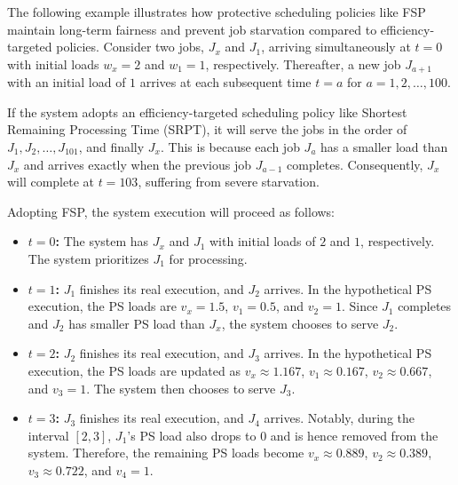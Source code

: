 
The following example illustrates how protective scheduling policies like FSP maintain long-term fairness and prevent job starvation compared to efficiency-targeted policies. Consider two jobs, $J_x$ and $J_1$, arriving simultaneously at $t=0$ with initial loads $w_x=2$ and $w_1=1$, respectively. Thereafter, a new job $J_{a+1}$ with an initial load of $1$ arrives at each subsequent time $t=a$ for $a = 1, 2, \dots, 100$.

If the system adopts an efficiency-targeted scheduling policy like Shortest Remaining Processing Time (SRPT), it will serve the jobs in the order of $J_1, \allowbreak J_2, \allowbreak \dots, \allowbreak J_{101}$, and finally $J_x$. This is because each job $J_a$ has a smaller load than $J_x$ and arrives exactly when the previous job $J_{a-1}$ completes. Consequently, $J_x$ will complete at $t=103$, suffering from severe starvation. 

Adopting FSP, the system execution will proceed as follows:

\begin{itemize}
    \item \textbf{$t=0$:} The system has $J_x$ and $J_1$ with initial loads of $2$ and $1$, respectively. The system prioritizes $J_1$ for processing.
    
    \item \textbf{$t=1$:} $J_1$ finishes its real execution, and $J_2$ arrives. In the hypothetical PS execution, the PS loads are $v_x=1.5$, $v_1=0.5$, and $v_2=1$. Since $J_1$ completes and $J_2$ has smaller PS load than $J_x$, the system chooses to serve $J_2$.
    
    \item \textbf{$t=2$:} $J_2$ finishes its real execution, and $J_3$ arrives. In the hypothetical PS execution, the PS loads are updated as $v_x \approx 1.167$, $v_1 \approx 0.167$, $v_2 \approx 0.667$, and $v_3=1$. The system then chooses to serve $J_3$.
    
    \item \textbf{$t=3$:} $J_3$ finishes its real execution, and $J_4$ arrives. Notably, during the interval $[2, 3]$, $J_1$'s PS load also drops to $0$ and is hence removed from the system. Therefore, the remaining PS loads become $v_x \approx 0.889$, $v_2 \approx 0.389$, $v_3 \approx 0.722$, and $v_4=1$.
\end{itemize}

